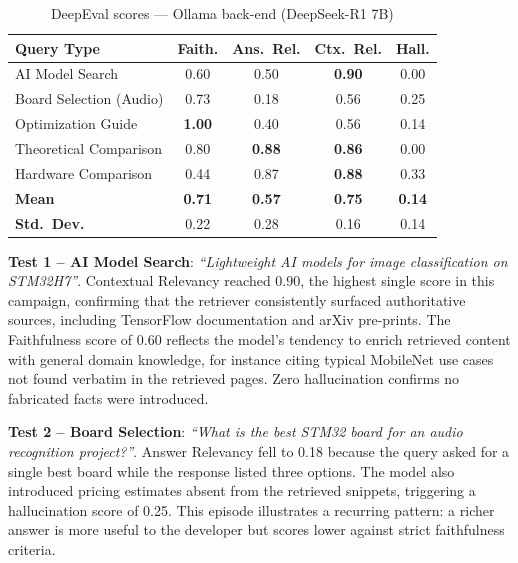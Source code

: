 \begin{table}[ht]
    \centering
    \caption{DeepEval scores --- Ollama back-end (DeepSeek-R1 7B)}
    \label{tab:deepeval-ollama}
    \begin{tabular}{|l|c|c|c|c|}
        \hline
        \textbf{Query Type}     & \textbf{Faith.} & \textbf{Ans.\ Rel.} & \textbf{Ctx.\ Rel.} & \textbf{Hall.} \\
        \hline
        AI Model Search         & 0.60            & 0.50                & \textbf{0.90}       & 0.00           \\
        Board Selection (Audio) & 0.73            & 0.18                & 0.56                & 0.25           \\
        Optimization Guide      & \textbf{1.00}   & 0.40                & 0.56                & 0.14           \\
        Theoretical Comparison  & 0.80            & \textbf{0.88}       & \textbf{0.86}       & 0.00           \\
        Hardware Comparison     & 0.44            & 0.87                & \textbf{0.88}       & 0.33           \\
        \hline
        \textbf{Mean}           & \textbf{0.71}   & \textbf{0.57}       & \textbf{0.75}       & \textbf{0.14}  \\
        \textbf{Std.\ Dev.}     & 0.22            & 0.28                & 0.16                & 0.14           \\
        \hline
    \end{tabular}
\end{table}

\textbf{Test 1 -- AI Model Search}: \textit{``Lightweight AI models for image classification on STM32H7''}. Contextual Relevancy reached 0.90, the highest single score in this campaign, confirming that the retriever consistently surfaced authoritative sources, including TensorFlow documentation and arXiv pre-prints. The Faithfulness score of 0.60 reflects the model's tendency to enrich retrieved content with general domain knowledge, for instance citing typical MobileNet use cases not found verbatim in the retrieved pages. Zero hallucination confirms no fabricated facts were introduced.

\textbf{Test 2 -- Board Selection}: \textit{``What is the best STM32 board for an audio recognition project?''}. Answer Relevancy fell to 0.18 because the query asked for a single best board while the response listed three options. The model also introduced pricing estimates absent from the retrieved snippets, triggering a hallucination score of 0.25. This episode illustrates a recurring pattern: a richer answer is more useful to the developer but scores lower against strict faithfulness criteria.

